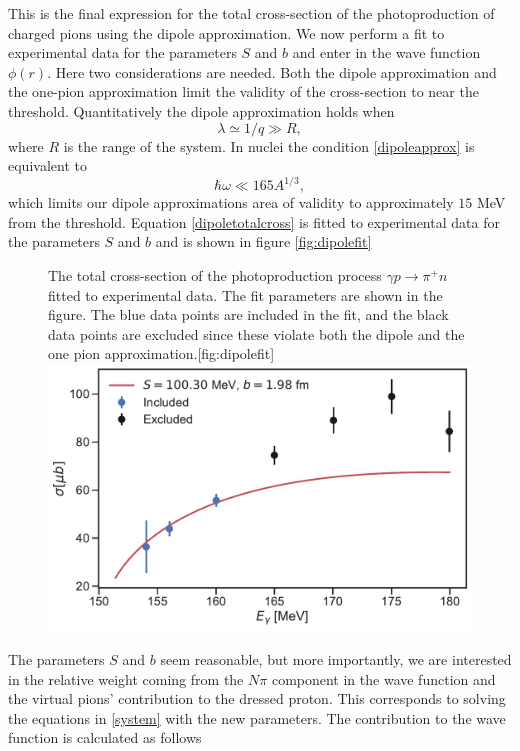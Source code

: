 This is the final expression for the total cross-section of the photoproduction of charged pions using the dipole approximation. We now perform a fit to experimental data for the parameters $S$ and $b$ and enter in the wave function $\phi(r)$. Here two considerations are needed. Both the dipole approximation and the one-pion approximation limit the validity of the cross-section to near the threshold. Quantitatively the dipole approximation holds when 
\begin{equation}\label{dipoleapprox}
	\lambda \simeq 1/q \gg R,
\end{equation}
where $R$ is the range of the system. In nuclei the condition \eqref{dipoleapprox} is equivalent to 
\begin{equation}\label{dipolenuc}
	\hbar \omega \ll 165 A^{1/3},
\end{equation}
which limits our dipole approximations area of validity to approximately $15$ MeV from the threshold. Equation \eqref{dipoletotalcross} is fitted to experimental data for the parameters $S$ and $b$ and is shown in figure \ref{fig:dipolefit}
\begin{figure}[H]
	\begin{sidecaption}{The total cross-section of the photoproduction process $\gamma p \rightarrow \pi^+ n$ fitted to experimental data. The fit parameters are shown in the figure. The blue data points are included in the fit, and the black data points are excluded since these violate both the dipole and the one pion approximation.}[fig:dipolefit]
		\includegraphics[width=\linewidth]{Figures/dipole_approximation.pdf}
	\end{sidecaption}
\end{figure}
The parameters $S$ and $b$ seem reasonable, but more importantly, we are interested in the relative weight coming from the $N\pi$ component in the wave function and the virtual pions' contribution to the dressed proton. This corresponds to solving the equations in \eqref{system} with the new parameters. The contribution to the wave function is calculated as follows
